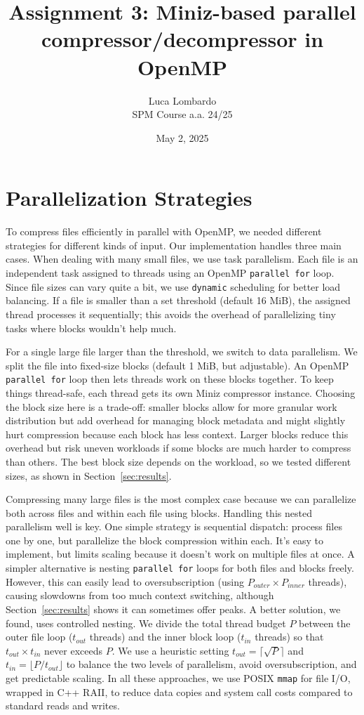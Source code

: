 \documentclass[10pt]{article}
\title{Assignment 3: Miniz-based parallel compressor/decompressor in OpenMP}
\author{Luca Lombardo \\ SPM Course a.a. 24/25}
\date{May 2, 2025}
\newcommand{\code}[1]{\texttt{#1}}
\begin{document}
\maketitle
\vspace{-1.5em} %

\section{Parallelization Strategies}

To compress files efficiently in parallel with OpenMP, we needed different strategies for different kinds of input. Our implementation handles three main cases. When dealing with many small files, we use task parallelism. Each file is an independent task assigned to threads using an OpenMP \code{parallel for} loop. Since file sizes can vary quite a bit, we use \code{dynamic} scheduling for better load balancing. If a file is smaller than a set threshold (default 16 MiB), the assigned thread processes it sequentially; this avoids the overhead of parallelizing tiny tasks where blocks wouldn't help much.

For a single large file larger than the threshold, we switch to data parallelism. We split the file into fixed-size blocks (default 1 MiB, but adjustable). An OpenMP \code{parallel for} loop then lets threads work on these blocks together. To keep things thread-safe, each thread gets its own Miniz compressor instance. Choosing the block size here is a trade-off: smaller blocks allow for more granular work distribution but add overhead for managing block metadata and might slightly hurt compression because each block has less context. Larger blocks reduce this overhead but risk uneven workloads if some blocks are much harder to compress than others. The best block size depends on the workload, so we tested different sizes, as shown in Section~\ref{sec:results}.

Compressing many large files is the most complex case because we can parallelize both across files and within each file using blocks. Handling this nested parallelism well is key. One simple strategy is sequential dispatch: process files one by one, but parallelize the block compression within each. It's easy to implement, but limits scaling because it doesn't work on multiple files at once. A simpler alternative is nesting \code{parallel for} loops for both files and blocks freely. However, this can easily lead to oversubscription (using $P_{outer} \times P_{inner}$ threads), causing slowdowns from too much context switching, although Section~\ref{sec:results} shows it can sometimes offer peaks. A better solution, we found, uses controlled nesting. We divide the total thread budget $P$ between the outer file loop ($t_{out}$ threads) and the inner block loop ($t_{in}$ threads) so that $t_{out} \times t_{in}$ never exceeds $P$. We use a heuristic setting $t_{out} = \lceil \sqrt{P} \rceil$ and $t_{in} = \lfloor P / t_{out} \rfloor$ to balance the two levels of parallelism, avoid oversubscription, and get predictable scaling. In all these approaches, we use POSIX \code{mmap} for file I/O, wrapped in C++ RAII, to reduce data copies and system call costs compared to standard reads and writes.
\end{document}
